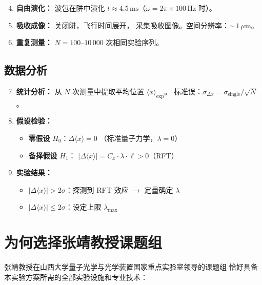 \documentclass[a4paper,11pt]{article}
\begin{document}
\begin{enumerate}
  \setcounter{enumi}{3}
  \item \textbf{自由演化：} 波包在阱中演化
    $t \approx 4{.}5\,\mathrm{ms}$（$\omega = 2\pi \times 100\,\mathrm{Hz}$ 时）。
  \item \textbf{吸收成像：} 关闭阱，飞行时间展开，
    采集吸收图像。空间分辨率：${\sim}\,1\,\mu\mathrm{m}$。
  \item \textbf{重复测量：} $N = 100\text{--}10\,000$ 次相同实验序列。
\end{enumerate}

\subsection{数据分析}

\begin{enumerate}
  \setcounter{enumi}{6}
  \item \textbf{统计分析：} 从 $N$ 次测量中提取平均位置
    $\langle x\rangle_{\mathrm{exp}}$。
    标准误：$\sigma_{\Delta x} = \sigma_{\mathrm{single}}/\sqrt{N}$。
  \item \textbf{假设检验：}
    \begin{itemize}
      \item \textbf{零假设} $H_0$：$\Delta\langle x\rangle = 0$
        （标准量子力学，$\lambda = 0$）
      \item \textbf{备择假设} $H_1$：
        $|\Delta\langle x\rangle| = C_x \cdot \lambda \cdot \ell > 0$（RFT）
    \end{itemize}
  \item \textbf{实验结果：}
    \begin{itemize}
      \item $|\Delta\langle x\rangle| > 2\sigma$：探测到 RFT 效应
        $\to$ 定量确定 $\lambda$
      \item $|\Delta\langle x\rangle| \leq 2\sigma$：设定上限
        $\lambda_{\max}$
    \end{itemize}
\end{enumerate}

\section{为何选择张靖教授课题组}

张靖教授在山西大学量子光学与光学装置国家重点实验室领导的课题组
恰好具备本实验方案所需的全部实验设施和专业技术：
\end{document}
